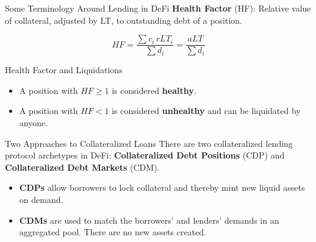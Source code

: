 \documentclass[handout]{beamer}
\begin{document}
\begin{frame}{Some Terminology Around Lending in DeFi}
\textbf{Health Factor} (HF): Relative value of collateral, adjusted by LT, to outstanding debt of a position.

\begin{equation*}
	  HF = \frac{\sum c_i \, rLT_i}{\sum d_i} =  \frac{aLT}{\sum d_i} 
	  \label{eq:HF} 
\end{equation*}

\vspace{1.0em}
\begin{keytakeaway}{Health Factor and Liquidations}
\begin{itemize}
	\item A position with $HF \geq 1$ is considered \textbf{healthy}.
	\item A position with $HF < 1$ is considered \textbf{unhealthy} and can be liquidated by anyone.
\end{itemize}
\end{keytakeaway}



\end{frame}

\begin{frame}{Two Approaches to Collateralized Loans}
	\vspace{1em}
	There are two collateralized lending protocol archetypes in DeFi: \textbf{Collateralized Debt Positions} (CDP) and \textbf{Collateralized Debt Markets} (CDM).\\ \vspace{1em}

	\begin{itemize}
		\item \textbf{CDPs} allow borrowers to lock collateral and thereby mint new liquid assets on demand.
		\item \textbf{CDMs} are used to match the borrowers' and lenders' demands in an aggregated pool. There are no new assets created.
	\end{itemize}
	
\end{frame}
\end{document}
